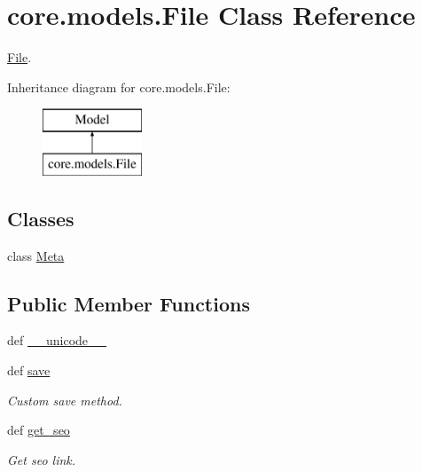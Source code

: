 \hypertarget{classcore_1_1models_1_1File}{\section{core.\-models.\-File Class Reference}
\label{classcore_1_1models_1_1File}
}


\hyperlink{classcore_1_1models_1_1File}{File}.  


Inheritance diagram for core.\-models.\-File\-:\begin{figure}[H]
\begin{center}
\leavevmode
\includegraphics[height=2.000000cm]{classcore_1_1models_1_1File}
\end{center}
\end{figure}
\subsection*{Classes}
\begin{DoxyCompactItemize}
\item 
class \hyperlink{classcore_1_1models_1_1File_1_1Meta}{Meta}
\end{DoxyCompactItemize}
\subsection*{Public Member Functions}
\begin{DoxyCompactItemize}
\item 
def \hyperlink{classcore_1_1models_1_1File_aa55a62aec4d1cbfab35d6a3acbcb7839}{\-\_\-\-\_\-unicode\-\_\-\-\_\-}
\item 
def \hyperlink{classcore_1_1models_1_1File_a22cd87afedaecdd3f0106d14f537602e}{save}
\begin{DoxyCompactList}\small\item\em Custom save method. \end{DoxyCompactList}\item 
def \hyperlink{classcore_1_1models_1_1File_a8b5338739bfbf9271fbe914ff6024d77}{get\-\_\-seo}
\begin{DoxyCompactList}\small\item\em Get seo link. \end{DoxyCompactList}\end{DoxyCompactItemize}
